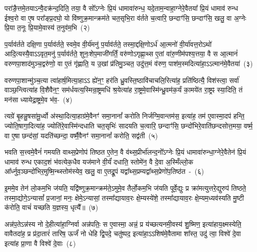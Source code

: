 परा॑ङै॒त्तमे॒तयाऽन्वै॒दक्र॑न्द॒दिति॒ तया॒ वै सो᳚\-ऽग्नेः प्रि॒यं धामावा॑रुन्ध॒ यदे॒ताम॒न्वाहा॒ग्नेरे॒वैतया᳚ प्रि॒यं धामाव॑ रुन्ध ईश्व॒रो वा ए॒ष परा᳚ङ्प्र॒दघो॒ यो वि॑ष्णुक्र॒मान्क्रम॑ते चत॒सृभि॒रा व॑र्तते च॒त्वारि॒ छन्दाꣳ॑सि॒ छन्दाꣳ॑सि॒ खलु॒ वा अ॒ग्नेः प्रि॒या त॒नूः प्रि॒यामे॒वास्य॑ त॒नुव॑म॒भि~(२)\ip

प॒र्याव॑र्तते दक्षि॒णा प॒र्याव॑र्तते॒ स्वमे॒व वी॒र्य॑मनु॑ प॒र्याव॑र्तते॒ तस्मा॒द्दक्षि॒णो\-ऽर्ध॑ आ॒त्मनो॑ वी॒र्या॑वत्त॒रो\-ऽथो॑ आदि॒त्यस्यै॒वा\-ऽऽवृत॒मनु॑ प॒र्याव॑र्तते॒ शुनः॒शेप॒माजी॑गर्तिं॒ वरु॑णो\-ऽगृह्णा॒थ्स ए॒तां वा॑रु॒णीम॑पश्य॒त्तया॒ वै स आ॒त्मानं॑ वरुणपा॒शाद॑मुञ्च॒द्वरु॑णो॒ वा ए॒तं गृ॑ह्णाति॒ य उ॒खां प्र॑तिमु॒ञ्चत॒ उदु॑त्त॒मं व॑रुण॒ पाश॑म॒स्मदित्या॑हा॒\-ऽऽ\-त्मान॑मे॒वैतया॑~(३)\ip

वरुणपा॒शान्मु॑ञ्च॒त्या त्वा॑हार्\mbox{}ष॒मित्या॒हाऽऽ ह्ये॑न॒ꣳ॒ हर॑ति ध्रु॒वस्ति॒ष्ठावि॑चाचलि॒रित्या॑ह॒ प्रति॑ष्ठित्यै॒ विश॑स्त्वा॒ सर्वा॑ वाञ्छ॒न्त्वित्या॑ह वि॒शैवैन॒ꣳ॒ सम॑र्धयत्य॒स्मिन्रा॒ष्ट्रमधि॑ श्र॒येत्या॑ह रा॒ष्ट्रमे॒वास्मि॑न्ध्रु॒वम॑क॒र्यं का॒मये॑त रा॒ष्ट्रꣴ स्या॒दिति॒ तं मन॑सा ध्यायेद्रा॒ष्ट्रमे॒व भ॑व॒-~(४)\ip

त्यग्रे॑ बृ॒हन्नु॒षसा॑मू॒र्ध्वो अ॑स्था॒दित्या॒हाग्र॑मे॒वैनꣳ॑ समा॒नानां᳚ करोति निर्जग्मि॒वान्तम॑स॒ इत्या॑ह॒ तम॑ ए॒वास्मा॒दप॑ हन्ति॒ ज्योति॒षागा॒दित्या॑ह॒ ज्योति॑रे॒वास्मि॑न्दधाति चत॒सृभिः॑ सादयति च॒त्वारि॒ छन्दाꣳ॑सि॒ छन्दो॑भिरे॒वाति॑छन्दसोत्त॒मया॒ वर्ष्म॒ वा ए॒षा छन्द॑सां॒ यदति॑च्छन्दा॒ वर्ष्मै॒वैनꣳ॑ समा॒नानां᳚ करोति॒ सद्व॑ती~(५)\ip

भवति स॒त्त्वमे॒वैनं॑ गमयति वाथ्स॒प्रेणोप॑ तिष्ठत ए॒तेन॒ वै व॑थ्स॒प्रीर्भा॑लन्द॒नो᳚\-ऽग्नेः प्रि॒यं धामावा॑रुन्धा॒ग्नेरे॒वैतेन॑ प्रि॒यं धामाव॑ रुन्ध एकाद॒शं भ॑वत्येक॒धैव यज॑माने वी॒र्यं॑ दधाति॒ स्तोमे॑न॒ वै दे॒वा अ॒स्मिँल्लो॒क आ᳚र्ध्नुव॒ञ्छन्दो॑भिर॒मुष्मि॒न्थ्स्तोम॑स्येव॒ खलु॒ वा ए॒तद्रू॒पं यद्वा᳚थ्स॒प्रम्यद्वा᳚थ्स॒प्रेणो॑प॒तिष्ठ॑त~-~(६)\ip

इ॒ममे॒व तेन॑ लो॒कम॒भि ज॑यति॒ यद्वि॑ष्णुक्र॒मान्क्रम॑ते॒\-ऽमुमे॒व तैर्लो॒कम॒भि ज॑यति पूर्वे॒द्युः प्र क्रा॑मत्युत्तरे॒द्युरुप॑ तिष्ठते॒ तस्मा॒द्योगे॒\-ऽन्यासां᳚ प्र॒जानां॒ मनः॒ क्षेमे॒\-ऽन्यासां॒ तस्मा᳚द्\-यायाव॒रः क्षे॒म्यस्ये॑शे॒ तस्मा᳚द्\-यायाव॒रः क्षे॒म्यम॒ध्यव॑स्यति मु॒ष्टी क॑रोति॒ वाचं॑ यच्छति य॒ज्ञस्य॒ धृत्यै᳚॥~(७)\ip

{}

अन्न॑प॒ते\-ऽन्न॑स्य नो दे॒हीत्या॑हा॒ग्निर्वा अन्न॑पतिः॒ स ए॒वास्मा॒ अन्नं॒ प्र य॑च्छत्यनमी॒वस्य॑ शु॒ष्मिण॒ इत्या॑हाय॒क्ष्मस्येति॒ वावैतदा॑ह॒ प्र प्र॑दा॒तारं॑ तारिष॒ ऊर्जं॑ नो धेहि द्वि॒पदे॒ चतु॑ष्पद॒ इत्या॑हा॒\-ऽऽ\-शिष॑मे॒वैतामा शा᳚स्त॒ उदु॑ त्वा॒ विश्वे॑ दे॒वा इत्या॑ह प्रा॒णा वै विश्वे॑ दे॒वाः~(८)\ip

